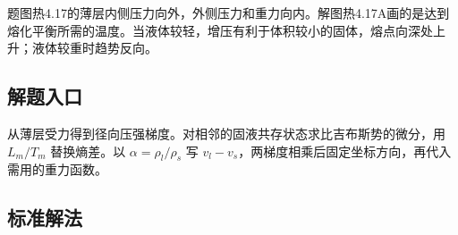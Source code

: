 \documentclass[UTF8,fontset=fandol,a4paper,11pt]{ctexart}
\begin{document}
题图热4.17的薄层内侧压力向外，外侧压力和重力向内。解图热4.17A画的是达到熔化平衡所需的温度。当液体较轻，增压有利于体积较小的固体，熔点向深处上升；液体较重时趋势反向。



\subsection*{解题入口}

从薄层受力得到径向压强梯度。对相邻的固液共存状态求比吉布斯势的微分，用 $L_m/T_m$ 替换熵差。以 $\alpha=\rho_l/\rho_s$ 写 $v_l-v_s$，两梯度相乘后固定坐标方向，再代入需用的重力函数。




\subsection*{标准解法}
\end{document}
